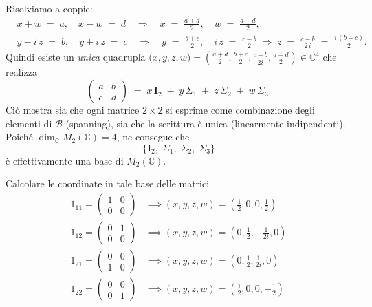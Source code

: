 \documentclass{article}
\theoremstyle{plain}
\theoremstyle{definition}
\theoremstyle{remark}
\begin{document}
Risolviamo a coppie:
\[
\begin{aligned}
&x + w \;=\; a, 
\quad
x - w \;=\; d
\quad\Longrightarrow\quad
x \;=\; \frac{a + d}{2}, 
\quad
w \;=\; \frac{a - d}{2}, 
\\[6pt]
&y - i\,z \;=\; b, 
\quad
y + i\,z \;=\; c
\quad\Longrightarrow\quad
y \;=\; \frac{b + c}{2}, 
\quad
i\,z \;=\; \frac{c - b}{2}
\;\Longrightarrow\;
z \;=\; \frac{c - b}{2\,i} \;=\; \frac{i\,(b - c)}{2}.
\end{aligned}
\]
Quindi esiste un \emph{unica} quadrupla \(\bigl(x,y,z,w\bigr)=\left(\frac{a+d}{2},\frac{b+c}{2},\frac{c-b}{2i},\frac{a-d}{2}\right)\in\mathbb{C}^4\) che realizza
\[
\begin{pmatrix}a & b\\ c & d\end{pmatrix}
\;=\;
x\,\mathbf{I}_2 \;+\; y\,\Sigma_1 \;+\; z\,\Sigma_2 \;+\; w\,\Sigma_3.
\]
Ciò mostra sia che ogni matrice \(2\times 2\) si esprime come combinazione degli elementi di \(\mathcal{B}\) (spanning), sia che la scrittura è unica (linearmente indipendenti). Poiché \(\dim_{\mathbb{C}}M_2(\mathbb{C})=4\), ne consegue che
\[
\{\mathbf{I}_2,\;\Sigma_1,\;\Sigma_2,\;\Sigma_3\}
\]
è effettivamente una base di \(M_2(\mathbb{C})\).

\vspace{10pt}

Calcolare le coordinate in tale base delle matrici 
\begin{align*}
    1_{11}=\begin{pmatrix} 1 & 0 \\ 0 & 0 \end{pmatrix}&\implies (x,y,z,w) = \left(\frac{1}{2},0,0,\frac{1}{2}\right)\\
    1_{12}=\begin{pmatrix} 0 & 1 \\ 0 & 0 \end{pmatrix}&\implies (x,y,z,w) = \left(0,\frac{1}{2},-\frac{1}{2i},0\right)\\
    1_{21}=\begin{pmatrix} 0 & 0 \\ 1 & 0 \end{pmatrix}&\implies (x,y,z,w) = \left(0,\frac{1}{2},\frac{1}{2i},0\right)\\
    1_{22}=\begin{pmatrix} 0 & 0 \\ 0 & 1 \end{pmatrix}&\implies (x,y,z,w) = \left(\frac{1}{2},0,0,-\frac{1}{2}\right)
\end{align*}
\end{document}
